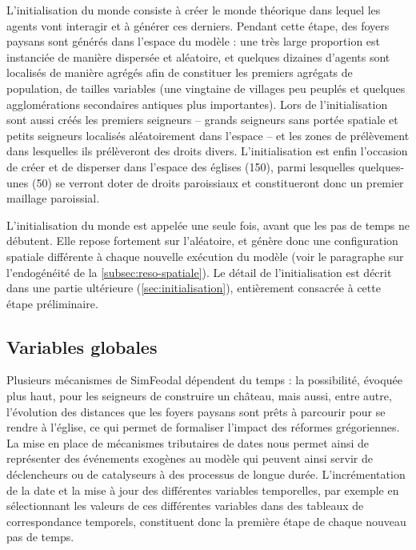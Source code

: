 L'initialisation du monde consiste à créer le monde théorique dans lequel les agents vont interagir et à générer ces derniers.
Pendant cette étape, des foyers paysans sont générés dans l'espace du modèle :  une très large proportion est instanciée de manière dispersée et aléatoire, et quelques dizaines d'agents sont localisés de manière agrégés afin de constituer les premiers agrégats de population, de tailles variables (une vingtaine de villages peu peuplés et quelques agglomérations secondaires antiques plus importantes).
Lors de l'initialisation sont aussi créés les premiers seigneurs -- grands seigneurs sans portée spatiale et petits seigneurs localisés aléatoirement dans l'espace -- et les zones de prélèvement dans lesquelles ils prélèveront des droits divers.
L'initialisation est enfin l'occasion de créer et de disperser dans l'espace des églises (150), parmi lesquelles quelques-unes (50) se verront doter de droits paroissiaux et constitueront donc un premier maillage paroissial.

L'initialisation du monde est appelée une seule fois, avant que les pas de temps ne débutent. Elle repose fortement sur l'aléatoire, et génère donc une configuration spatiale différente à chaque nouvelle exécution du modèle (voir le paragraphe sur l'endogénéité de la \cref{subsec:reso-spatiale}).
Le détail de l'initialisation est décrit dans une partie ultérieure (\cref{sec:initialisation}), entièrement consacrée à cette étape préliminaire.

\subsection{Variables globales \label{meca-variables}}

Plusieurs mécanismes de SimFeodal dépendent du temps : la possibilité, évoquée plus haut, pour les seigneurs de construire un château, mais aussi, entre autre, l'évolution des distances que les foyers paysans sont prêts à parcourir pour se rendre à l'église, ce qui permet de formaliser l'impact des réformes grégoriennes.
La mise en place de mécanismes tributaires de dates nous permet ainsi de représenter des événements exogènes au modèle qui peuvent ainsi servir de déclencheurs ou de catalyseurs à des processus de longue durée.
L'incrémentation de la date et la mise à jour des différentes variables temporelles, par exemple en sélectionnant les valeurs de ces différentes variables dans des tableaux de correspondance temporels, constituent donc la première étape de chaque nouveau pas de temps.

